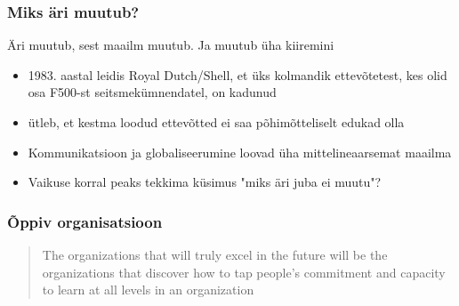 \begin{frame}[fragile]
  \frametitle{Miks äri muutub?}
  Äri muutub, sest maailm muutub. Ja muutub üha kiiremini
	\begin{itemize}
		\item 1983. aastal leidis Royal Dutch/Shell, et üks kolmandik ettevõtetest, kes olid osa F500-st seitsmekümnendatel, on kadunud \citep{senge19905th}
		\item \cite{foster2011creative} ütleb, et kestma loodud ettevõtted ei saa põhimõtteliselt edukad olla
		\item Kommunikatsioon ja globaliseerumine loovad üha mittelineaarsemat maailma
		\item Vaikuse korral peaks tekkima küsimus "miks äri juba ei muutu"?
	\end{itemize}
\end{frame}

\begin{frame}[fragile]
  \frametitle{Õppiv organisatsioon}
  \begin{center}
  	\begin{quote}
		The organizations that will truly excel in the future will be the organizations that discover how to tap people's commitment and capacity to learn at all levels in an organization
	\end{quote}
  \end{center}
  \cite{senge19905th}
\end{frame}

